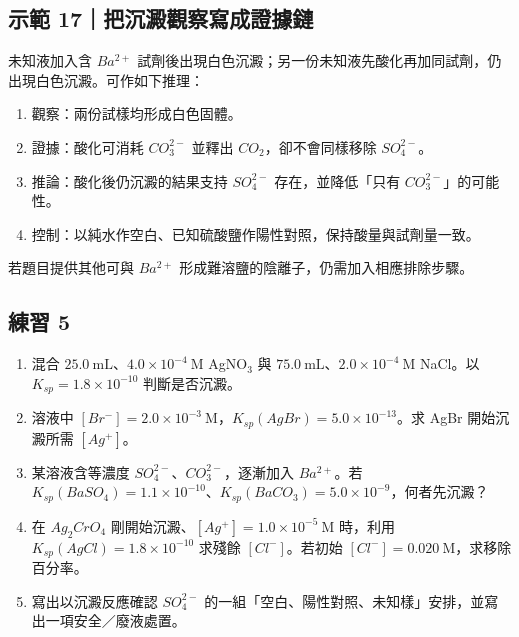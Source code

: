 \documentclass[11pt,a4paper]{article}
\providecommand{\tightlist}{%
  \setlength{\itemsep}{0pt}\setlength{\parskip}{0pt}}
\begin{document}
\begin{HandoutWorkedExample}

\subsection{示範 17｜把沉澱觀察寫成證據鏈}\label{ux793aux7bc4-17ux628aux6c89ux6fb1ux89c0ux5bdfux5bebux6210ux8b49ux64daux93c8}

未知液加入含 \(Ba^{2+}\) 試劑後出現白色沉澱；另一份未知液先酸化再加同試劑，仍出現白色沉澱。可作如下推理：

\begin{enumerate}
\def\labelenumi{\arabic{enumi}.}
\tightlist
\item
  觀察：兩份試樣均形成白色固體。
\item
  證據：酸化可消耗 \(CO_3^{2-}\) 並釋出 \(CO_2\)，卻不會同樣移除 \(SO_4^{2-}\)。
\item
  推論：酸化後仍沉澱的結果支持 \(SO_4^{2-}\) 存在，並降低「只有 \(CO_3^{2-}\)」的可能性。
\item
  控制：以純水作空白、已知硫酸鹽作陽性對照，保持酸量與試劑量一致。
\end{enumerate}

若題目提供其他可與 \(Ba^{2+}\) 形成難溶鹽的陰離子，仍需加入相應排除步驟。

\end{HandoutWorkedExample}

\subsection{練習 5}\label{ux7df4ux7fd2-5}

\begin{enumerate}
\def\labelenumi{\arabic{enumi}.}
\tightlist
\item
  混合 \(25.0\ \mathrm{mL}\)、\(4.0\times10^{-4}\ \mathrm M\) AgNO\(_3\) 與 \(75.0\ \mathrm{mL}\)、\(2.0\times10^{-4}\ \mathrm M\) NaCl。以 \(K_{sp}=1.8\times10^{-10}\) 判斷是否沉澱。
\item
  溶液中 \([Br^-]=2.0\times10^{-3}\ \mathrm M\)，\(K_{sp}(AgBr)=5.0\times10^{-13}\)。求 AgBr 開始沉澱所需 \([Ag^+]\)。
\item
  某溶液含等濃度 \(SO_4^{2-}\)、\(CO_3^{2-}\)，逐漸加入 \(Ba^{2+}\)。若 \(K_{sp}(BaSO_4)=1.1\times10^{-10}\)、\(K_{sp}(BaCO_3)=5.0\times10^{-9}\)，何者先沉澱？
\item
  在 \(Ag_2CrO_4\) 剛開始沉澱、\([Ag^+]=1.0\times10^{-5}\ \mathrm M\) 時，利用 \(K_{sp}(AgCl)=1.8\times10^{-10}\) 求殘餘 \([Cl^-]\)。若初始 \([Cl^-]=0.020\ \mathrm M\)，求移除百分率。
\item
  寫出以沉澱反應確認 \(SO_4^{2-}\) 的一組「空白、陽性對照、未知樣」安排，並寫出一項安全／廢液處置。
\end{enumerate}
\end{document}
